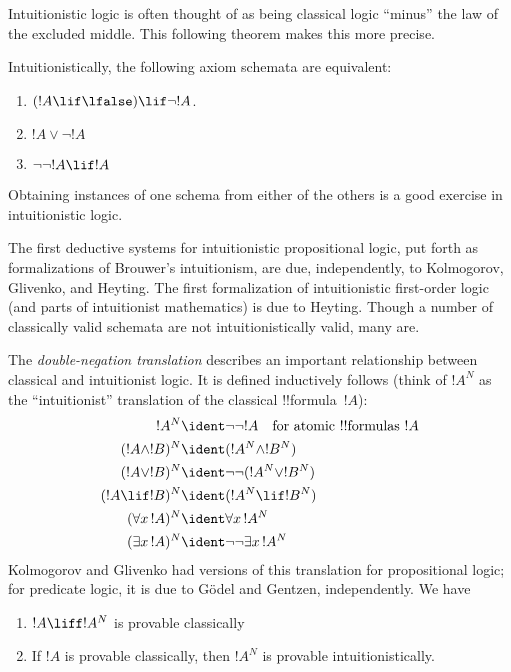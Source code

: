 \documentclass[../../../include/open-logic-section]{subfiles}
\begin{document}
Intuitionistic logic is often thought of as being classical logic
``minus'' the law of the excluded middle. This following theorem makes
this more precise.
\begin{thm}
Intuitionistically, the following axiom schemata are equivalent:
\begin{enumerate}
\item $(!A \lif \lfalse) \lif \lnot !A$.
\item $!A \lor \lnot !A$
\item $\lnot \lnot !A \lif !A$
\end{enumerate}
\end{thm}
Obtaining instances of one schema from either of the others is a good
exercise in intuitionistic logic.

The first deductive systems for intuitionistic propositional
logic, put forth as formalizations of Brouwer's intuitionism, are due,
independently, to Kolmogorov, Glivenko, and Heyting. The first
formalization of intuitionistic first-order logic (and parts of
intuitionist mathematics) is due to Heyting. Though a number of
classically valid schemata are not intuitionistically valid, many are.

The \emph{double-negation translation} describes an important
relationship between classical and intuitionist logic. It is defined
inductively follows (think of $!A^N$ as the ``intuitionist''
translation of the classical !!{formula}~$!A$):
\begin{align*}
!A^N & \ident \lnot\lnot !A \quad \text{for atomic !!{formula}s $!A$} \\
(!A \land !B)^N & \ident (!A^N \land !B^N) \\
(!A \lor !B)^N & \ident  \lnot\lnot (!A^N \lor !B^N) \\
(!A \lif !B)^N & \ident (!A^N \lif !B^N) \\
(\lforall[x][!A])^N & \ident \lforall[x][!A^N] \\
(\lexists[x][!A])^N & \ident \lnot\lnot\lexists[x][!A^N]
\end{align*}
Kolmogorov and Glivenko had versions of this translation for
propositional logic; for predicate logic, it is due to G\"odel and
Gentzen, independently. We have

\begin{thm}
\begin{enumerate}
\item $!A \liff !A^N$ is provable classically
\item If $!A$ is provable classically, then $!A^N$ is provable
  intuitionistically.
\end{enumerate}
\end{thm}
\end{document}
